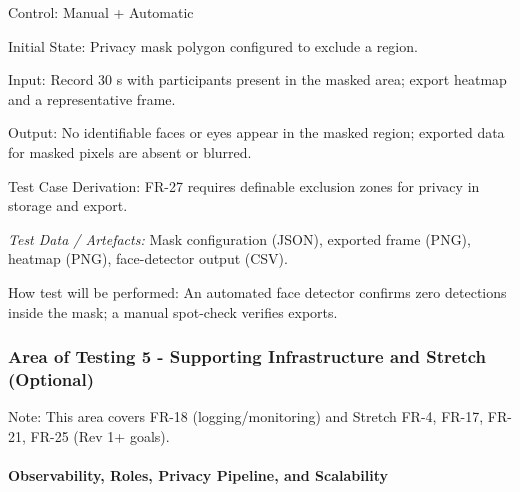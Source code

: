 \documentclass[12pt, titlepage]{article}
\begin{document}
\begin{enumerate}
Control: Manual + Automatic

Initial State: Privacy mask polygon configured to exclude a region.

Input: Record 30 s with participants present in the masked area; export heatmap and a representative frame.

Output: No identifiable faces or eyes appear in the masked region; exported data for masked pixels are absent or blurred.

Test Case Derivation: FR-27 requires definable exclusion zones for privacy in storage and export.

\textit{Test Data / Artefacts:} Mask configuration (JSON), exported frame (PNG), heatmap (PNG), face-detector output (CSV).

How test will be performed: An automated face detector confirms zero detections inside the mask; a manual spot-check verifies exports.

\end{enumerate}


\subsubsection{Area of Testing 5 - Supporting Infrastructure and Stretch (Optional)}

Note: This area covers FR-18 (logging/monitoring) and Stretch FR-4, FR-17, FR-21, FR-25 (Rev 1+ goals).

\paragraph{Observability, Roles, Privacy Pipeline, and Scalability}
\end{document}
